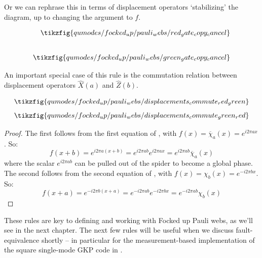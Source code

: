 Or we can rephrase this in terms of displacement operators `stabilizing' the diagram, up to changing the argument to $f$.

\begin{lemma}\label{lem:red_gate_copy_cancel}
    \begin{equation}\label{eq:red_gate_copy_cancel}
        \begin{aligned}
            \tikzfig{qumodes/focked_up/pauli_webs/red_gate_copy_cancel} \\[20pt]
            \tikzfig{qumodes/focked_up/pauli_webs/green_gate_copy_cancel}
        \end{aligned}
    \end{equation}
\end{lemma}

An important special case of this rule is the commutation relation between displacement operators $\hat{X}(a)$ and $\hat{Z}(b)$.

\begin{lemma}\label{lem:displacement_commutation_relation_zx}
    \begin{equation}
        \tikzfig{qumodes/focked_up/pauli_webs/displacements_commute_red_green}
    \end{equation}
    \begin{equation}
        \tikzfig{qumodes/focked_up/pauli_webs/displacements_commute_green_red}
    \end{equation}
    \begin{proof}
        The first follows from the first equation of , with $f(x) = \overline{\chi}_a(x) = e^{i2\pi ax}$.
        So:
        \begin{equation}
            f(x + b) = e^{i2\pi a(x + b)} = e^{i2\pi ab}e^{i2\pi ax} = e^{i2\pi ab} \overline{\chi}_a(x)
        \end{equation}
        where the scalar $e^{i2\pi ab}$ can be pulled out of the spider to become a global phase.
        The second follows from the second equation of , with $f(x) = \chi_b(x) = e^{-i2\pi bx}$.
        So:
        \begin{equation}
            f(x + a) = e^{-i2\pi b(x + a)} = e^{-i2\pi ab}e^{-i2\pi bx} = e^{-i2\pi ab} \chi_b(x)
        \end{equation}
    \end{proof}
\end{lemma}

These rules are key to defining and working with Focked up Pauli webs, as we'll see in the next chapter.
The next few rules will be useful when we discuss fault-equivalence shortly -- in particular for the measurement-based implementation of the square single-mode GKP code in .

